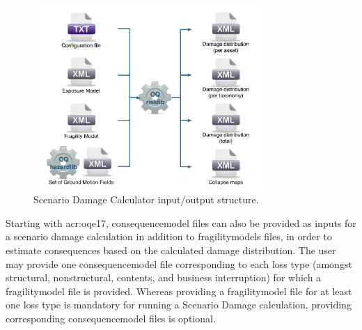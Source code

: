 \begin{figure}[ht]
\centering
\includegraphics[width=9cm,height=7cm]{figures/risk/io-structure-scenario-damage.pdf}
\caption{Scenario Damage Calculator input/output structure.}
\label{fig:io-structure-scenario-damage}
\end{figure}

Starting with \glsdesc{acr:oqe17}, \gls{consequencemodel} files can also be
provided as inputs for a scenario damage calculation in addition to
\glspl{fragilitymodel} files, in order to estimate consequences based on the
calculated damage distribution. The user may provide one
\gls{consequencemodel} file corresponding to each loss type (amongst
structural, nonstructural, contents, and business interruption) for which a
\gls{fragilitymodel} file is provided. Whereas providing a
\gls{fragilitymodel} file for at least one loss type is mandatory for running
a Scenario Damage calculation, providing corresponding \gls{consequencemodel}
files is optional.

